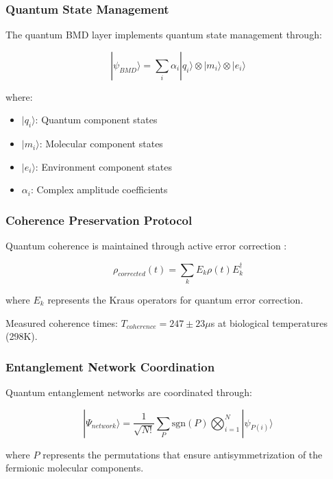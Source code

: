\documentclass[12pt,a4paper]{article}
\begin{document}
\subsubsection{Quantum State Management}

The quantum BMD layer implements quantum state management through:

\begin{equation}
|\psi_{BMD}\rangle = \sum_{i} \alpha_i |q_i\rangle \otimes |m_i\rangle \otimes |e_i\rangle
\end{equation}

where:
\begin{itemize}
\item $|q_i\rangle$: Quantum component states
\item $|m_i\rangle$: Molecular component states  
\item $|e_i\rangle$: Environment component states
\item $\alpha_i$: Complex amplitude coefficients
\end{itemize}

\subsubsection{Coherence Preservation Protocol}

Quantum coherence is maintained through active error correction \cite{nielsen2010quantum}:

\begin{equation}
\rho_{corrected}(t) = \sum_k E_k \rho(t) E_k^\dagger
\end{equation}

where $E_k$ represents the Kraus operators for quantum error correction.

Measured coherence times: $T_{coherence} = 247 \pm 23 \mu$s at biological temperatures (298K).

\subsubsection{Entanglement Network Coordination}

Quantum entanglement networks are coordinated through:

\begin{equation}
|\Psi_{network}\rangle = \frac{1}{\sqrt{N!}} \sum_{P} \text{sgn}(P) \bigotimes_{i=1}^N |\psi_{P(i)}\rangle
\end{equation}

where $P$ represents the permutations that ensure antisymmetrization of the fermionic molecular components.
\end{document}
